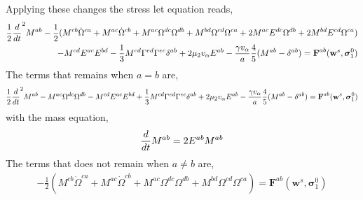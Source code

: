 Applying these changes the stress let equation reads, 
\begin{align*}
    \frac{1}{2}\frac{d}{d t}^2 M^{ab}
    -\frac{1}{2}(
        M^{cb} \dot{\Omega}^{ca}
        + M^{ac} \dot{\Omega}^{cb}
        + M^{ac} \Omega^{dc} \Omega^{db}  
        + M^{bd} \Omega^{cd}  \Omega^{ca}
        + 2 M^{ac} E^{dc} \Omega^{db}  
        + 2 M^{bd} E^{cd} \Omega^{ca}
        )\\
        - M^{cd} E^{ac} E^{bd} 
        - \frac{1}{3} M^{cd}
        \Gamma^{ed}\Gamma^{ec}  
        \delta^{ab}
    + 2 \mu_2 v_\alpha E^{ab}
    - \frac{\gamma v_\alpha }{a} 
    \frac{4  }{5} (M^{ab} - \delta^{ab})
    = \textbf{F}^{ab}(\textbf{w}^s,\bm\sigma_1^0)
\end{align*}
The terms that remains when $a=b$ are, 
\begin{align*}
    \frac{1}{2}\frac{d}{d t}^2 M^{ab}
    - M^{ac} \Omega^{dc} \Omega^{db}  
    - M^{cd} E^{ac} E^{bd} 
    + \frac{1}{3} M^{cd}
    \Gamma^{ed}\Gamma^{ec}  
    \delta^{ab}
    + 2 \mu_2 v_\alpha E^{ab}
    - \frac{\gamma v_\alpha }{a} 
    \frac{4  }{5} (M^{ab} - \delta^{ab})
    = \textbf{F}^{ab}(\textbf{w}^s,\bm\sigma_1^0)
\end{align*}
with the mass equation, 
\begin{align*}
    \frac{d}{d t} M^{ab}
    = 2 E^{ab}M^{ab}
\end{align*}
The terms that does not remain when $a\neq b$ are, 
\begin{align*}
    -\frac{1}{2}(
        M^{cb} \dot{\Omega}^{ca}
        + M^{ac} \dot{\Omega}^{cb}
        + M^{ac} \Omega^{dc} \Omega^{db}  
        + M^{bd} \Omega^{cd}  \Omega^{ca}
        )
    = \textbf{F}^{ab}(\textbf{w}^s,\bm\sigma_1^0)
\end{align*}
